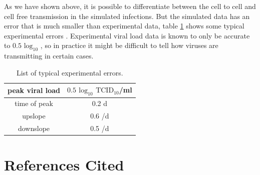 \documentclass[a4paper]{article}
\begin{document}
As we have shown above, it is possible to differentiate between the cell to cell and cell free transmission in the simulated infections. But the simulated data has an error that is much smaller than experimental data, table \ref{tab:AdvectionSpeeds} shows some typical experimental errors \cite{Parra, LaBarre}. Experimental viral load data is known to only be accurate to $0.5$ $\mathrm{log}_{10}$ \cite{LaBarre}, so in practice it might be difficult to tell how viruses are transmitting in certain cases.

\begin{table}[h]
    \centering
    \caption{List of typical experimental errors.}
    \begin{tabular}{|c|c|}
        \hline
        peak viral load  & $0.5$ $\mathrm{log}_{10}$ $\mathrm{TCID}_{10}$/ml\\
        \hline
        time of peak  & 0.2 d\\
        \hline
        upslope  & 0.6 /d\\
        \hline
        downslope  & 0.5 /d\\
        \hline
    \end{tabular}
    \label{tab:AdvectionSpeeds}
\end{table}

\clearpage

\section{References Cited}
\end{document}
